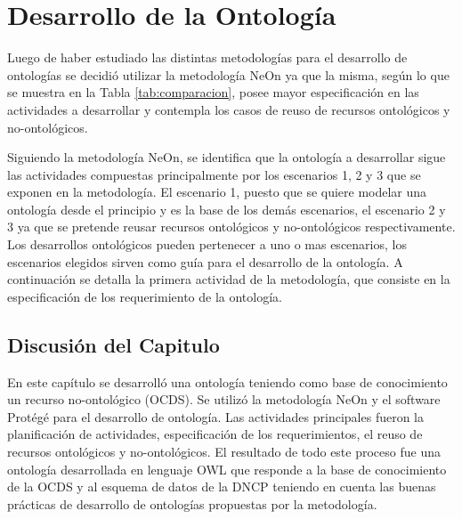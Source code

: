 \chapter{Desarrollo de la Ontología}
\label{chap:Desarrollo de la Ontologia}

Luego de haber estudiado las distintas metodologías para el desarrollo de ontologías se decidió utilizar la metodología NeOn ya que la misma, según lo que se muestra en la Tabla  \ref{tab:comparacion}, posee mayor especificación en las actividades a desarrollar  y contempla los casos de reuso de recursos ontológicos y no-ontológicos. 

Siguiendo la metodología NeOn, se identifica que la ontología a desarrollar sigue las actividades compuestas principalmente por los escenarios 1, 2 y 3 que se exponen en la metodología. El escenario 1, puesto que se quiere modelar una ontología desde el principio y es la base de los demás escenarios, el escenario 2 y 3 ya que se pretende reusar recursos ontológicos y no-ontológicos respectivamente. Los desarrollos ontológicos pueden pertenecer a uno o mas escenarios, los escenarios elegidos sirven como guía para el desarrollo de la ontología. A continuación se detalla la primera actividad de la metodología, que consiste en la especificación de los requerimiento de la ontología.









\section{Discusión del Capitulo}

En este capítulo se desarrolló una ontología teniendo como base de conocimiento un recurso no-ontológico (OCDS). Se utilizó la metodología NeOn y el software Protégé para el desarrollo de ontología. Las actividades principales fueron la planificación de actividades, especificación de los requerimientos, el reuso de recursos ontológicos y no-ontológicos. El resultado de todo este proceso fue una ontología desarrollada en lenguaje OWL que responde a la base de conocimiento de la OCDS y al esquema de datos de la DNCP teniendo en cuenta las buenas prácticas de desarrollo de ontologías propuestas por la metodología.




